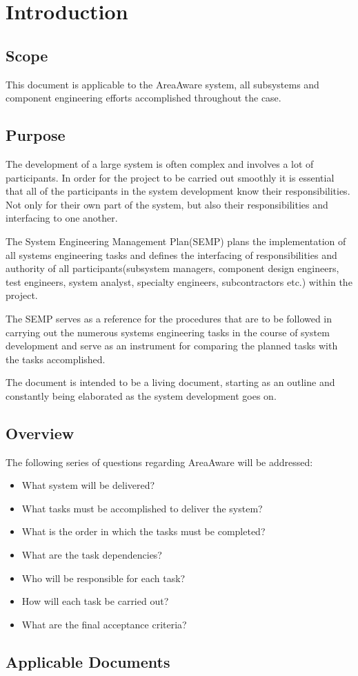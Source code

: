 %
\thispagestyle{fancy}
\chapter{Introduction}
\label{chp:intro}


\section{Scope}
This document is applicable to the AreaAware system, all subsystems and component engineering efforts accomplished throughout the case.

\section{Purpose}
The development of a large system is often complex and involves a lot of participants.
In order for the project to be carried out smoothly it is essential that all of the participants in the system development know their responsibilities.
Not only for their own part of the system, but also their responsibilities and interfacing to one another.

The System Engineering Management Plan(SEMP) plans the implementation of all systems engineering tasks and defines the interfacing of responsibilities and authority of all participants(subsystem managers, component design engineers, test engineers, system analyst, specialty engineers, subcontractors etc.) within the project.

The SEMP serves as a reference for the procedures that are to be followed in carrying out the numerous systems engineering tasks in the course of system development and serve as an instrument for comparing the planned tasks with the tasks accomplished.

The document is intended to be a living document, starting as an outline and constantly being elaborated as the system development goes on.


\section{Overview}
The following series of questions regarding AreaAware will be addressed:
\begin{itemize}
    \item What system will be delivered?
    \item What tasks must be accomplished to deliver the system?
    \item What is the order in which the tasks must be completed?
    \item What are the task dependencies?
    \item Who will be responsible for each task?
    \item How will each task be carried out?
    \item What are the final acceptance criteria?
\end{itemize}

\section{Applicable Documents}



